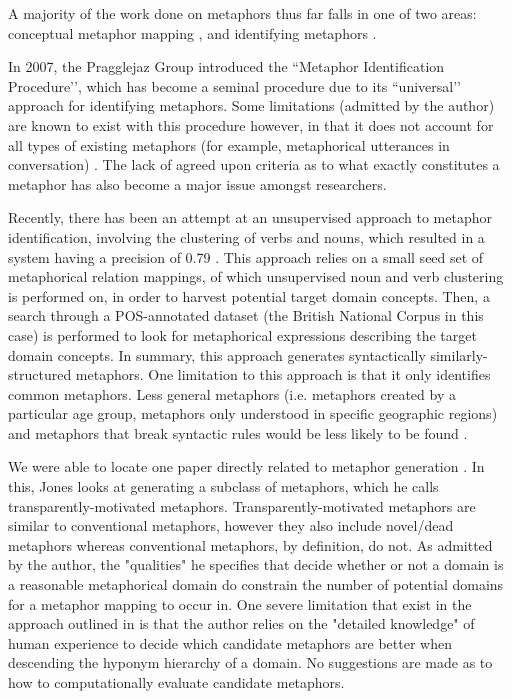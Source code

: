 \documentclass[12pt]{article}
\begin{document}
A majority of the work done on metaphors thus far falls in one of two areas: conceptual metaphor mapping \cite{lakoff89} \cite{lakoff80}, and identifying metaphors \cite{pragglejaz} \cite{shutova101}.

In 2007, the Pragglejaz Group introduced the ``Metaphor Identification Procedure’’, which has become a seminal procedure due to its ``universal’’ approach for identifying metaphors. Some limitations (admitted by the author) are known to exist with this procedure however, in that it does not account for all types of existing metaphors (for example, metaphorical utterances in conversation) \cite{pragglejaz}. The lack of agreed upon criteria as to what exactly constitutes a metaphor has also become a major issue amongst researchers.

Recently, there has been an attempt at an unsupervised approach to metaphor identification, involving the clustering of verbs and nouns, which resulted in a system having a precision of 0.79 \cite{shutova101}. This approach relies on a small seed set of metaphorical relation mappings, of which unsupervised noun and verb clustering is performed on, in order to harvest potential target domain concepts. Then, a search through a POS-annotated dataset (the British National Corpus in this case) is performed to look for metaphorical expressions describing the target domain concepts. In summary, this approach generates syntactically similarly-structured metaphors. One limitation to this approach is that it only identifies common metaphors. Less general metaphors (i.e. metaphors created by a particular age group, metaphors only understood in specific geographic regions) and metaphors that break syntactic rules would be less likely to be found \cite{gentner01}.

We were able to locate one paper directly related to metaphor generation \cite{jones92}. In this, Jones looks at generating a subclass of metaphors, which he calls transparently-motivated metaphors. Transparently-motivated metaphors are similar to conventional metaphors, however they also include novel/dead metaphors whereas conventional metaphors, by definition, do not. As admitted by the author, the "qualities" he specifies that decide whether or not a domain is a reasonable metaphorical domain do constrain the number of potential domains for a metaphor mapping to occur in. One severe limitation that exist in the approach outlined in \cite{jones92} is that the author relies on the "detailed knowledge" of human experience to decide which candidate metaphors are better when descending the hyponym hierarchy of a domain. No suggestions are made as to how to computationally evaluate candidate metaphors.
\end{document}
